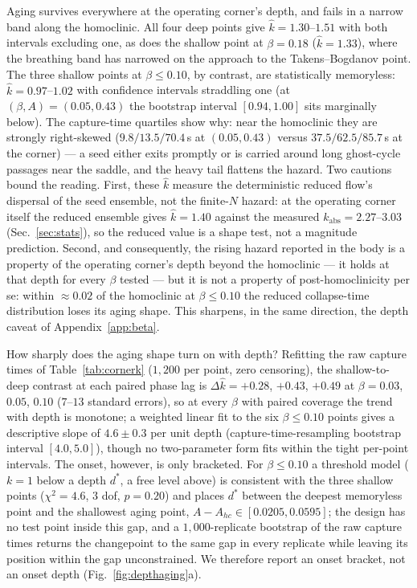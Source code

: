 \documentclass[pdflatex,sn-mathphys,Numbered]{sn-jnl}
\begin{document}
\begin{appendices}
Aging survives everywhere at the operating corner's depth, and fails in a
narrow band along the homoclinic. All four deep points give
$\hat k = 1.30$--$1.51$ with both intervals excluding one, as does the shallow
point at $\beta = 0.18$ ($\hat k = 1.33$), where the breathing band has
narrowed on the approach to the Takens--Bogdanov point. The three shallow
points at $\beta \le 0.10$, by contrast, are statistically memoryless:
$\hat k = 0.97$--$1.02$ with confidence intervals straddling one (at
$(\beta, A) = (0.05, 0.43)$ the bootstrap interval $[0.94, 1.00]$ sits
marginally below). The capture-time quartiles show why: near the homoclinic
they are strongly right-skewed ($9.8/13.5/70.4$\,s at $(0.05, 0.43)$ versus
$37.5/62.5/85.7$\,s at the corner) --- a seed either exits promptly or is
carried around long ghost-cycle passages near the saddle, and the heavy tail
flattens the hazard. Two cautions bound the reading. First, these $\hat k$
measure the deterministic reduced flow's dispersal of the seed ensemble, not
the finite-$N$ hazard: at the operating corner itself the reduced ensemble
gives $\hat k = 1.40$ against the measured $k_{\mathrm{abs}} = 2.27$--$3.03$
(Sec.~\ref{sec:stats}), so the reduced value is a shape test, not a magnitude
prediction. Second, and consequently, the rising hazard reported in the body
is a property of the operating corner's depth beyond the homoclinic --- it
holds at that depth for every $\beta$ tested --- but it is not a property of
post-homoclinicity per se: within ${\approx}0.02$ of the homoclinic at
$\beta \le 0.10$ the reduced collapse-time distribution loses its aging shape.
This sharpens, in the same direction, the depth caveat of
Appendix~\ref{app:beta}.

How sharply does the aging shape turn on with depth? Refitting the raw capture
times of Table~\ref{tab:cornerk} ($1{,}200$ per point, zero censoring), the
shallow-to-deep contrast at each paired phase lag is
$\Delta\hat k = +0.28$, $+0.43$, $+0.49$ at $\beta = 0.03$, $0.05$, $0.10$
($7$--$13$ standard errors), so at every $\beta$ with paired coverage the trend
with depth is monotone; a weighted linear fit to the six $\beta \le 0.10$
points gives a descriptive slope of $4.6 \pm 0.3$ per unit depth
(capture-time-resampling bootstrap interval $[4.0, 5.0]$), though no
two-parameter form fits within the tight per-point intervals. The onset,
however, is only bracketed. For $\beta \le 0.10$ a threshold model ($k = 1$
below a depth $d^*$, a free level above) is consistent with the three shallow
points ($\chi^2 = 4.6$, $3$ dof, $p = 0.20$) and places $d^*$ between the
deepest memoryless point and the shallowest aging point,
$A - A_{hc} \in [0.0205, 0.0595]$; the design has no test point inside this
gap, and a $1{,}000$-replicate bootstrap of the raw capture times returns the
changepoint to the same gap in every replicate while leaving its position
within the gap unconstrained. We therefore report an onset bracket, not an
onset depth (Fig.~\ref{fig:depthaging}a).


\end{appendices}
\end{document}
